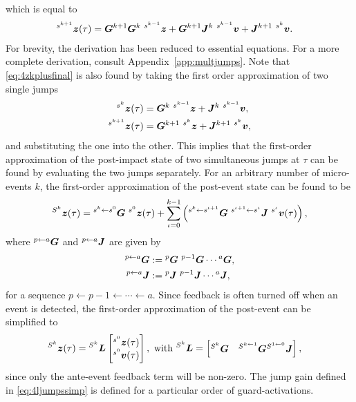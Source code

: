 \documentclass[../DC2017114Bouma.tex]{subfiles}
\begin{document}
which is equal to
\begin{align}
&\ls^{s^{k+1}}\zb(\tau) = \Gb^{k+1}\Gb^k\ ^{s^{k-1}}\zb + \Gb^{k+1}\Jb^{k}\ ^{s^{k-1}}\vb + \Jb^{k+1}\ ^{s^{k}}\vb.\label{eq:4zkplusfinal}
\end{align}
For brevity, the derivation has been reduced to essential equations. For a more complete derivation, consult Appendix~\ref{app:multjumps}. Note that \eqref{eq:4zkplusfinal} is also found by taking the first order approximation of two single jumps
\begin{align}
\ls^{s^{k}}\zb(\tau) &= \Gb^k\ ^{s^{k-1}}\zb + \Jb^{k}\ ^{s^{k-1}}\vb,\\
\ls^{s^{k+1}}\zb(\tau) &= \Gb^{k+1}\ ^{s^{k}}\zb + \Jb^{k+1}\ ^{s^{k}}\vb,
\end{align}
and substituting the one into the other. This implies that the first-order approximation of the post-impact state of two simultaneous jumps at $\tau$ can be found by evaluating the two jumps separately. For an arbitrary number of micro-events $k$, the first-order approximation of the post-event state can be found to be
\begin{align}
\ls^{S^k}\zb(\tau) = \ls^{s^k\leftarrow s^0}\Gb\ ^{s^0}\zb(\tau) + \sum_{\iota=0}^{k-1}\left(\ls^{s^{k}\leftarrow s^{\iota+1}}\Gb\ ^{s^{\iota+1}\leftarrow s^{\iota}}\Jb\ ^{s^{\iota}}\vb(\tau)\right),\label{eq:4ljumps}
\end{align}
where $\hspace{0cm}^{p\leftarrow a}{\boldsymbol{G}}$ and $\hspace{0cm}^{p\leftarrow a}{\boldsymbol{J}}$ are given by
\begin{align}
\hspace{0cm}^{p\leftarrow a}{\boldsymbol{G}} &:= \hspace{0cm}^{p}{\boldsymbol{G}}\ ^{p-1}{\boldsymbol{G}}\cdots\hspace{0cm}^{a}{\boldsymbol{G}},\\
\hspace{0cm}^{p\leftarrow a}{\boldsymbol{J}} &:= \hspace{0cm}^{p}{\boldsymbol{J}}\ ^{p-1}{\boldsymbol{J}}\cdots\hspace{0cm}^{a}{\boldsymbol{J}},
\end{align}
for a sequence $p\leftarrow p-1 \leftarrow \cdots \leftarrow a$. Since feedback is often turned off when an event is detected, the first-order approximation of the post-event can be simplified to
\begin{align}
\hspace{0cm}^{S^k}{\boldsymbol{z}}(\tau) &= \hspace{0cm}^{S^k}{\boldsymbol{L}} \begin{bmatrix}
\hspace{0cm}^{s^0}{\boldsymbol{z}}(\tau) \\ \hspace{0cm}^{s^0}{\boldsymbol{v}}(\tau)
\end{bmatrix}, \text{ with }\hspace{0cm}^{S^k}{\boldsymbol{L}} = \begin{bmatrix}
\hspace{0cm}^{S^k}{\boldsymbol{G}} & \hspace{0cm}^{S^{k\leftarrow 1}}{\boldsymbol{G}}\hspace{0cm}^{S^{1\leftarrow 0}}{\boldsymbol{J}}
\end{bmatrix},\label{eq:4ljumpssimp}
\end{align}
since only the ante-event feedback term will be non-zero. The jump gain defined in \eqref{eq:4ljumpssimp} is defined for a particular order of guard-activations.
\end{document}
